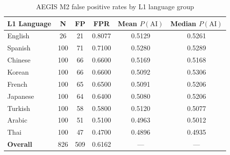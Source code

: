 \begin{table}[ht]
\centering
\caption{AEGIS M2 false positive rates by L1 language group}
\label{tab:fairness}
\begin{tabular}{lccccc}
\hline
\textbf{L1 Language} & \textbf{N} & \textbf{FP} & \textbf{FPR} & \textbf{Mean $P(\text{AI})$} & \textbf{Median $P(\text{AI})$} \\
\hline
English & 26 & 21 & 0.8077 & 0.5129 & 0.5261 \\
Spanish & 100 & 71 & 0.7100 & 0.5280 & 0.5289 \\
Chinese & 100 & 66 & 0.6600 & 0.5169 & 0.5168 \\
Korean & 100 & 66 & 0.6600 & 0.5092 & 0.5306 \\
French & 100 & 65 & 0.6500 & 0.5091 & 0.5206 \\
Japanese & 100 & 64 & 0.6400 & 0.5080 & 0.5206 \\
Turkish & 100 & 58 & 0.5800 & 0.5120 & 0.5077 \\
Arabic & 100 & 51 & 0.5100 & 0.4963 & 0.5012 \\
Thai & 100 & 47 & 0.4700 & 0.4896 & 0.4935 \\
\hline
\textbf{Overall} & 826 & 509 & 0.6162 & — & — \\
\hline
\end{tabular}
\end{table}